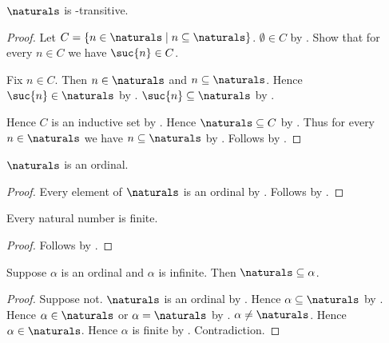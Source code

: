 \begin{proposition}\label{naturals_is_transitive_set}
    $\naturals$ is \in-transitive.
\end{proposition}
\begin{proof}
    Let $C=\{n\in\naturals\mid n\subseteq\naturals\}$.
    $\emptyset\in C$ by .
    Show that for every $n\in C$ we have $\suc{n}\in C$.
    \begin{subproof}
        Fix $n\in C$.
        Then $n\in\naturals$ and $n\subseteq\naturals$.
        Hence $\suc{n}\in\naturals$ by .
        $\suc{n}\subseteq\naturals$ by .
    \end{subproof}
    Hence $C$ is an inductive set by .
    Hence $\naturals\subseteq C$ by .
    Thus for every $n\in\naturals$ we have $n\subseteq\naturals$
        by .
    Follows by .
\end{proof}

\begin{proposition}\label{omega_is_ordinal}
    $\naturals$ is an ordinal.
\end{proposition}
\begin{proof}
    Every element of $\naturals$ is an ordinal
        by .
    Follows by
        .
\end{proof}

\begin{proposition}\label{natural_number_is_finite}
    Every natural number is finite.
\end{proposition}
\begin{proof}
    Follows by .
\end{proof}

\begin{proposition}\label{omega_below_infinite_ordinal}
    Suppose $\alpha$ is an ordinal and $\alpha$ is infinite.
    Then $\naturals\subseteq\alpha$.
\end{proposition}
\begin{proof}
    Suppose not.
    $\naturals$ is an ordinal by .
    Hence $\alpha\subseteq\naturals$ by
        .
    Hence $\alpha\in\naturals$ or $\alpha=\naturals$ by
        .
    $\alpha\neq\naturals$.
    Hence $\alpha\in\naturals$.
    Hence $\alpha$ is finite by .
    Contradiction.
\end{proof}

